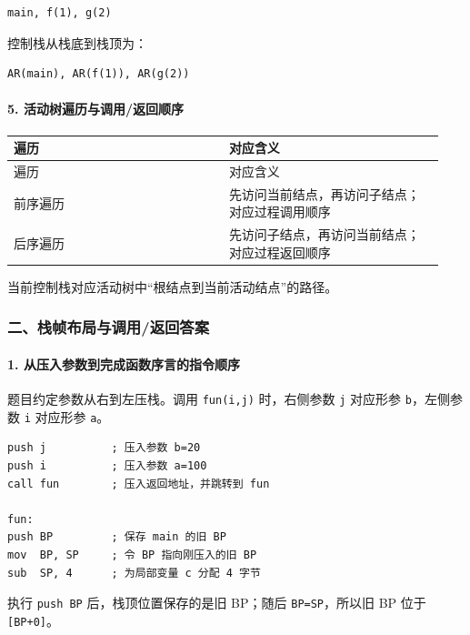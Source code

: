 \documentclass[UTF8]{ctexart}
\begin{document}
\begin{Verbatim}[fontsize=\small,breaklines=true]
main, f(1), g(2)
\end{Verbatim}

控制栈从栈底到栈顶为：

\begin{Verbatim}[fontsize=\small,breaklines=true]
AR(main), AR(f(1)), AR(g(2))
\end{Verbatim}

\paragraph*{5. 活动树遍历与调用/返回顺序}

\begin{longtable}{|p{0.47\linewidth}|p{0.47\linewidth}|}
\hline
遍历 & 对应含义 \\
\hline
\endfirsthead
遍历 & 对应含义 \\
\hline
\endhead
前序遍历 & 先访问当前结点，再访问子结点；对应过程调用顺序 \\
\hline
后序遍历 & 先访问子结点，再访问当前结点；对应过程返回顺序 \\
\hline
\end{longtable}

当前控制栈对应活动树中“根结点到当前活动结点”的路径。

\subsubsection*{二、栈帧布局与调用/返回答案}

\paragraph*{1. 从压入参数到完成函数序言的指令顺序}

题目约定参数从右到左压栈。调用 \texttt{fun(i,j)} 时，右侧参数 \texttt{j} 对应形参 \texttt{b}，左侧参数 \texttt{i} 对应形参 \texttt{a}。

\begin{Verbatim}[fontsize=\small,breaklines=true]
push j          ; 压入参数 b=20
push i          ; 压入参数 a=100
call fun        ; 压入返回地址，并跳转到 fun

fun:
push BP         ; 保存 main 的旧 BP
mov  BP, SP     ; 令 BP 指向刚压入的旧 BP
sub  SP, 4      ; 为局部变量 c 分配 4 字节
\end{Verbatim}

执行 \texttt{push BP} 后，栈顶位置保存的是旧 BP；随后 \texttt{BP=SP}，所以旧 BP 位于 \texttt{[BP+0]}。
\end{document}
